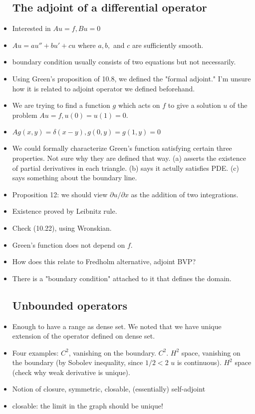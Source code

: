 \documentclass{article}
\theoremstyle{remark}
\begin{document}
\begin{itemize}
\subsection*{The adjoint of a differential operator}
\item Interested in $Au=f, Bu=0$
\item $Au=au''+bu'+cu$ where $a,b,$ and $c$ are sufficiently smooth.
\item boundary condition usually consists of two equations but not necessarily. 
\item Using Green's proposition of 10.8, we defined the "formal adjoint." I'm unsure how it is related to adjoint operator we defined beforehand.
\item We are trying to find a function $g$ which acts on $f$ to give a solution $u$ of the problem $Au=f,u(0)=u(1)=0$.
\item $Ag(x,y)=\delta (x-y), g(0,y)=g(1,y)=0$
\item We could formally characterize Green's function satisfying certain three properties. Not sure why they are defined that way. (a) asserts the existence of partial derivatives in each triangle. (b) says it actully satisfies PDE. (c) says something about the boundary line.
\item Proposition 12: we should view $\partial u/\partial x$ as the addition of two integrations.
\item Existence proved by Leibnitz rule.
\item Check (10.22), using Wronskian.
\item Green's function does not depend on $f$.
\item How does this relate to Fredholm alternative, adjoint BVP?
\item There is a "boundary condition" attached to it that defines the domain.














\subsection*{Unbounded operators}
\item Enough to have a range as dense set. We noted that we have unique extension of the operator defined on dense set.
\item Four examples: $C^2$, vanishing on the boundary. $C^2$. $H^2$ space, vanishing on the boundary (by Sobolev inequality, since $1/2<2$ $u$ is continuous). $H^2$ space (check why weak derivative is unique).
\item Notion of closure, symmetric, closable, (essentially) self-adjoint
\item closable: the limit in the graph should be unique!


\end{itemize}
\end{document}
